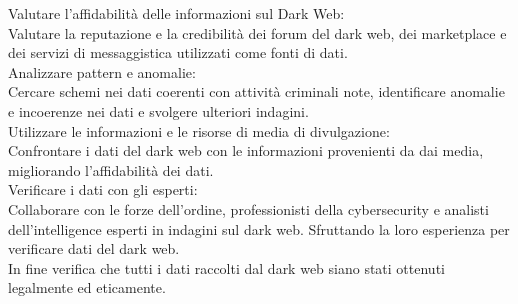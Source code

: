 Valutare l'affidabilità delle informazioni sul Dark Web:
\\Valutare la reputazione e la credibilità dei forum del dark web, dei marketplace e dei servizi di messaggistica utilizzati come fonti di dati.\\

Analizzare pattern e anomalie:
\\Cercare schemi nei dati coerenti con attività criminali note, identificare anomalie e incoerenze nei dati e svolgere ulteriori indagini.\\

Utilizzare le informazioni e le risorse di media di divulgazione:
\\Confrontare i dati del dark web con le informazioni provenienti da dai media, migliorando l'affidabilità dei dati.\\

Verificare i dati con gli esperti:
\\Collaborare con le forze dell'ordine, professionisti della cybersecurity e analisti dell'intelligence esperti in indagini sul dark web. Sfruttando la loro esperienza per verificare dati del dark web.\\

In fine verifica che tutti i dati raccolti dal dark web siano stati ottenuti legalmente ed eticamente.